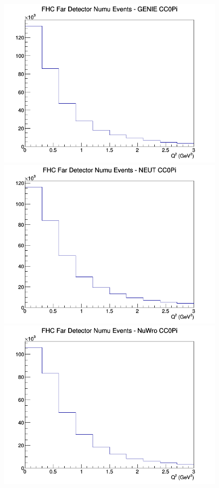 \begin{figure}[h]
\endminipage
\newline
{}
\includegraphics[width=\linewidth]{Q2/nominal/CC0Pi_FHC_FD_numu_Q2_GENIE.png}
\endminipage
{}
\includegraphics[width=\linewidth]{Q2/nominal/CC0Pi_FHC_FD_numu_Q2_NEUT.png}
\endminipage
{}
\includegraphics[width=\linewidth]{Q2/nominal/CC0Pi_FHC_FD_numu_Q2_NuWro.png}

\end{figure}
